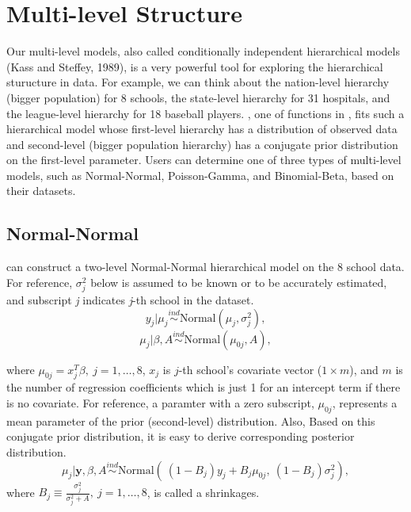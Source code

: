 \documentclass[article]{jss}
\begin{document}
\section[Multi-level Structure]{Multi-level Structure}
Our multi-level models, also called conditionally independent hierarchical models (Kass and Steffey, 1989), is a very powerful tool for exploring the hierarchical sturucture in data. For example, we can think about the nation-level hierarchy (bigger population) for 8 schools, the state-level hierarchy for 31 hospitals, and the league-level hierarchy for 18 baseball players. , one of functions in , fits such a hierarchical model whose first-level hierarchy has a distribution of observed data and second-level (bigger population hierarchy) has a conjugate prior distribution on the first-level parameter. Users can determine one of three types of multi-level models, such as Normal-Normal, Poisson-Gamma, and Binomial-Beta, based on their datasets. 
\\

 
\subsection[Normal-Normal]{Normal-Normal}
 can construct a two-level Normal-Normal hierarchical model on the 8 school data. For reference,  $\sigma^{2}_{j}$ below is assumed to be known or to be accurately estimated, and subscript \emph{j} indicates \emph{j}-th school in the dataset.
\begin{equation}
y_{j}\vert \mu_{j} \stackrel{ind}{\sim}\textrm{Normal}(\mu_{j}, \sigma^{2}_{j}),
\end{equation}
\begin{equation}
\mu_{j}\vert \beta, A\stackrel{ind}{\sim}\textrm{Normal}(\mu_{0j}, A),
\end{equation}

where $\mu_{0j} =x^{T}_{j}\beta,~j=1, \ldots, 8$, $x_{j}$ is $j$-th school's covariate vector ($1\times m$), and $m$ is the number of regression coefficients which is just 1 for an intercept term if there is no covariate. For reference, a paramter with a zero subscript, $\mu_{0j}$, represents a mean parameter of the prior (second-level) distribution. Also,  Based on this conjugate prior distribution, it is easy to derive corresponding posterior distribution. 
\begin{equation}
\mu_{j}\vert \textbf{y}, \beta, A \stackrel{ind}{\sim}\textrm{Normal}(~(1-B_{j})y_{j} + B_{j}\mu_{0j},~(1-B_{j})\sigma^{2}_{j}),
\end{equation}
where $B_{j}\equiv\frac{\sigma^{2}_{j}}{\sigma^{2}_{j} + A},~j=1, \ldots, 8$, is called a shrinkages.
\end{document}
